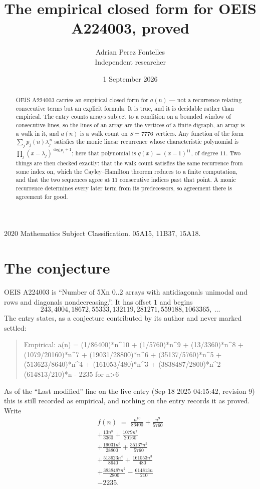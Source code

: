 \documentclass[11pt,a4paper]{article}
\title{The empirical closed form for OEIS A224003, proved}
\author{Adrian Perez Fontelles\\ \small Independent researcher}
\date{1 September 2026}
\theoremstyle{plain}
\theoremstyle{definition}
\begin{document}
\maketitle

\begin{abstract}
OEIS A224003 carries an empirical closed form for $a(n)$ --- not a recurrence relating
consecutive terms but an explicit formula. It is true, and it is decidable rather than
empirical. The entry counts arrays subject to a condition on a bounded window of consecutive lines, so the lines of an array are the
vertices of a finite digraph, an array is a walk in it, and $a(n)$ is a walk count on
$S=7776$ vertices. Any function of the form $\sum_j p_j(n)\lambda_j^{\,n}$ satisfies the
monic linear recurrence whose characteristic polynomial is
$\prod_j(x-\lambda_j)^{\deg p_j+1}$; here that polynomial is $q(x)=(x-1)^{11}$, of degree
$11$. Two things are then checked exactly: that the walk count satisfies the same
recurrence from some index on, which the Cayley--Hamilton theorem reduces to a finite
computation, and that the two sequences agree at $11$ consecutive indices past that
point. A monic recurrence determines every later term from its predecessors, so agreement
there is agreement for good.
\end{abstract}

\noindent\small 2020 Mathematics Subject Classification. 05A15, 11B37, 15A18.\normalsize

\section{The conjecture}

OEIS A224003 is ``Number of 5Xn 0..2 arrays with antidiagonals unimodal and rows and diagonals nondecreasing.''. It has offset $1$ and begins
\[
243, 4004, 18672, 55333, 132119, 281271, 559188, 1063365,\ \dots
\]
The entry states, as a conjecture contributed by its author and never marked settled:
\begin{quote}
Empirical: a(n) = (1/86400)*n\^{}10 + (1/5760)*n\^{}9 + (13/3360)*n\^{}8 + (1079/20160)*n\^{}7 + (19031/28800)*n\^{}6 + (35137/5760)*n\^{}5 + (513623/8640)*n\^{}4 + (161053/480)*n\^{}3 + (3838487/2800)*n\^{}2 - (614813/210)*n - 2235 for n>6
\end{quote}
As of the ``Last modified'' line on the live entry (Sep 18 2025 04:15:42, revision 9) this is still
recorded as empirical, and nothing on the entry records it as proved. Write
\begin{multline*}
f(n)\;=\;\frac{n^{10}}{86400} + \frac{n^{9}}{5760} \\
+ \frac{13 n^{8}}{3360} + \frac{1079 n^{7}}{20160} \\
+ \frac{19031 n^{6}}{28800} + \frac{35137 n^{5}}{5760} \\
+ \frac{513623 n^{4}}{8640} + \frac{161053 n^{3}}{480} \\
+ \frac{3838487 n^{2}}{2800} - \frac{614813 n}{210} \\
- 2235.
\end{multline*}
\end{document}
